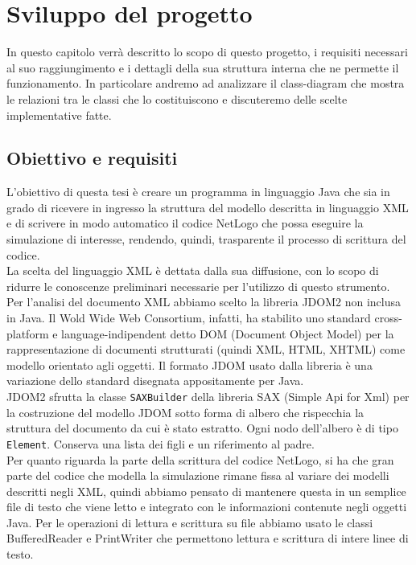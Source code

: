 \chapter{Sviluppo del progetto}
\label{cap:sviluppo-progetto}
In questo capitolo verrà descritto lo scopo di questo progetto, i requisiti necessari al suo raggiungimento e i dettagli della sua struttura interna che ne permette il funzionamento. In particolare andremo ad analizzare il class-diagram che mostra le relazioni tra le classi che lo costituiscono e discuteremo delle scelte implementative fatte.

\section{Obiettivo e requisiti}
L'obiettivo di questa tesi è creare un programma in linguaggio Java che sia in grado di ricevere in ingresso la struttura del modello descritta in linguaggio XML e di scrivere in modo automatico il codice NetLogo che possa eseguire la simulazione di interesse, rendendo, quindi, trasparente il processo di scrittura del codice.\\
La scelta del linguaggio XML è dettata dalla sua diffusione, con lo scopo di ridurre le conoscenze preliminari necessarie per l'utilizzo di questo strumento.\\
Per l'analisi del documento XML abbiamo scelto la libreria JDOM2  non inclusa in Java. Il Wold Wide Web Consortium, infatti, ha stabilito uno standard cross-platform e language-indipendent detto DOM (Document Object Model) per la rappresentazione di documenti strutturati (quindi XML, HTML, XHTML) come modello orientato agli oggetti. Il formato JDOM \cite{jdom} usato dalla libreria è una variazione dello standard disegnata appositamente per Java.\\
JDOM2 sfrutta la classe \texttt{SAXBuilder} della libreria SAX (Simple Api for Xml) per la costruzione del modello JDOM sotto forma di albero che rispecchia la struttura del documento da cui è stato estratto. Ogni nodo dell'albero è di tipo \texttt{Element}. Conserva una lista dei figli e un riferimento al padre.\\
Per quanto riguarda la parte della scrittura del codice NetLogo, si ha che gran parte del codice che modella la simulazione rimane fissa al variare dei modelli descritti negli XML, quindi abbiamo pensato di mantenere questa in un semplice file di testo che viene letto e integrato con le informazioni contenute negli oggetti Java. Per le operazioni di lettura e scrittura su file abbiamo usato le classi BufferedReader e PrintWriter che permettono lettura e scrittura di intere linee di testo.\\ 
